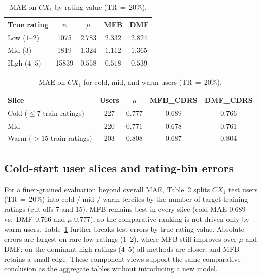 \documentclass[pdflatex,sn-mathphys-num]{sn-jnl}%
\theoremstyle{thmstyleone}%
\theoremstyle{thmstyletwo}%
\theoremstyle{thmstylethree}%
\begin{document}
\begin{table}[!htbp]
\centering
\caption{MAE on $CX_1$ by rating value (TR\,$=$\,20\%).}
\label{tab:rating_bins}
\renewcommand{\arraystretch}{1.15}
\small
\begin{tabularx}{\textwidth}{>{\raggedright\arraybackslash}X cccc}
\toprule
\textbf{True rating} & \textbf{$n$} & $\mu$ & MFB & DMF \\
\midrule
Low ($1$--$2$) & 1075 & $2.783$ & $2.332$ & $2.824$ \\
Mid ($3$) & 1819 & $1.324$ & $1.112$ & $1.365$ \\
High ($4$--$5$) & 15839 & $0.558$ & $0.518$ & $0.539$ \\
\bottomrule
\end{tabularx}
\end{table}

\begin{table}[!htbp]
\centering
\caption{MAE on $CX_1$ for cold, mid, and warm users (TR\,$=$\,20\%).}
\label{tab:coldstart}
\renewcommand{\arraystretch}{1.15}
\small
\begin{tabularx}{\textwidth}{>{\raggedright\arraybackslash}X cccc}
\toprule
\textbf{Slice} & \textbf{Users} & $\mu$ & MFB\_CDRS & DMF\_CDRS \\
\midrule
Cold ($\le 7$ train ratings) & 227 & $0.777$ & $0.689$ & $0.766$ \\
Mid & 220 & $0.771$ & $0.678$ & $0.761$ \\
Warm ($> 15$ train ratings) & 203 & $0.808$ & $0.687$ & $0.804$ \\
\bottomrule
\end{tabularx}
\end{table}

\subsection{Cold-start user slices and rating-bin errors}\label{sec:coldstart}
For a finer-grained evaluation beyond overall MAE, Table~\ref{tab:coldstart} splits $CX_1$ test users (TR\,$=$\,20\%) into cold / mid / warm terciles by the number of target training ratings (cut-offs 7 and 15). MFB remains best in every slice (cold MAE $0.689$ vs.\ DMF $0.766$ and $\mu$ $0.777$), so the comparative ranking is not driven only by warm users. Table~\ref{tab:rating_bins} further breaks test errors by true rating value. Absolute errors are largest on rare low ratings ($1$--$2$), where MFB still improves over $\mu$ and DMF; on the dominant high ratings ($4$--$5$) all methods are closer, and MFB retains a small edge. These component views support the same comparative conclusion as the aggregate tables without introducing a new model.
\end{document}
